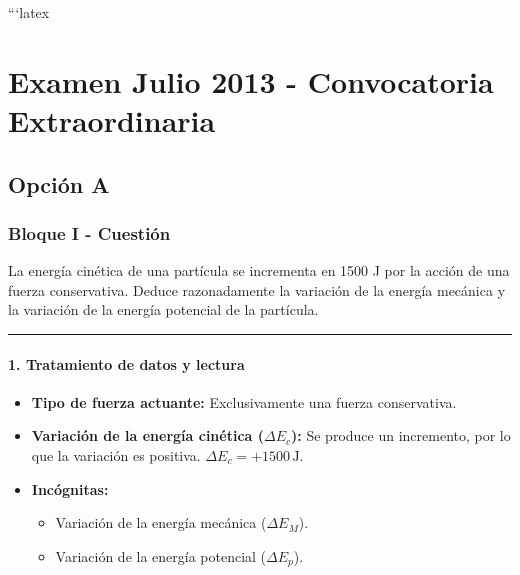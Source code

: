 ```latex
\chapter{Examen Julio 2013 - Convocatoria Extraordinaria}
\label{chap:2013_jul_ext}

\section{Opción A}
\label{sec:A_2013_jul_ext}

\subsection{Bloque I - Cuestión}
\label{subsec:A1_2013_jul_ext}

\begin{cajaenunciado}
La energía cinética de una partícula se incrementa en 1500 J por la acción de una fuerza conservativa. Deduce razonadamente la variación de la energía mecánica y la variación de la energía potencial de la partícula.
\end{cajaenunciado}
\hrule

\subsubsection*{1. Tratamiento de datos y lectura}
\begin{itemize}
    \item \textbf{Tipo de fuerza actuante:} Exclusivamente una fuerza conservativa.
    \item \textbf{Variación de la energía cinética ($\Delta E_c$):} Se produce un incremento, por lo que la variación es positiva. $\Delta E_c = +1500\,\text{J}$.
    \item \textbf{Incógnitas:}
    \begin{itemize}
        \item Variación de la energía mecánica ($\Delta E_M$).
        \item Variación de la energía potencial ($\Delta E_p$).
    \end{itemize}
\end{itemize}

